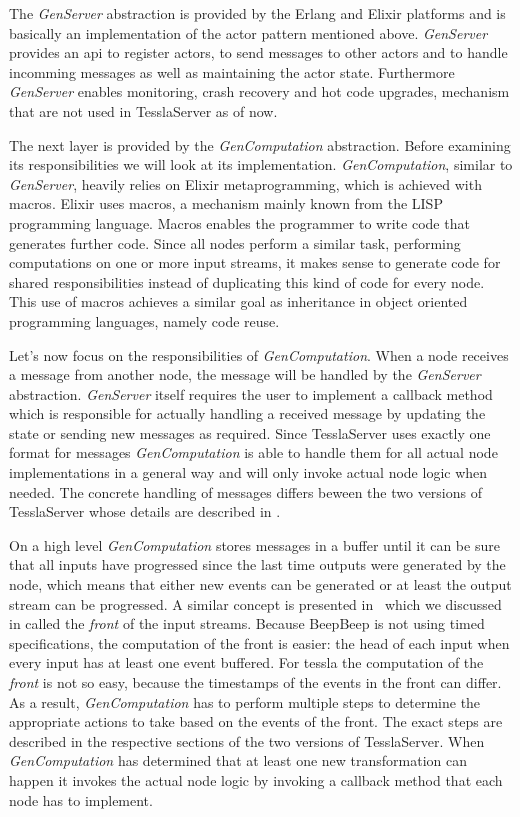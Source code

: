 The \emph{GenServer} abstraction is provided by the Erlang and Elixir platforms and is basically an implementation of the actor pattern mentioned above.
\emph{GenServer} provides an \gls{api} to register actors, to send messages to other actors and to handle incomming messages as well as maintaining the actor state.
Furthermore \emph{GenServer} enables monitoring, crash recovery and hot code upgrades, mechanism that are not used in TesslaServer as of now.

The next layer is provided by the \emph{GenComputation} abstraction.
Before examining its responsibilities we will look at its implementation.
\emph{GenComputation}, similar to \emph{GenServer}, heavily relies on Elixir metaprogramming, which is achieved with macros.
Elixir uses macros, a mechanism mainly known from the LISP programming language.
Macros enables the programmer to write code that generates further code.
Since all nodes perform a similar task, performing computations on one or more input streams, it makes sense to generate code for shared responsibilities instead of duplicating this kind of code for every node.
This use of macros achieves a similar goal as inheritance in object oriented programming languages, namely code reuse.

Let's now focus on the responsibilities of \emph{GenComputation}.
When a node receives a message from another node, the message will be handled by the \emph{GenServer} abstraction.
\emph{GenServer} itself requires the user to implement a callback method which is responsible for actually handling a received message by updating the state or sending new messages as required.
Since TesslaServer uses exactly one format for messages \emph{GenComputation} is able to handle them for all actual node implementations in a general way and will only invoke actual node logic when needed.
The concrete handling of messages differs beween the two versions of TesslaServer whose details are described in .

On a high level \emph{GenComputation} stores messages in a buffer until it can be sure that all inputs have progressed since the last time outputs were generated by the node, which means that either new events can be generated or at least the output stream can be progressed.
A similar concept is presented in~\cite{Hall2011} which we discussed in  called the \emph{front} of the input streams.
Because BeepBeep is not using timed specifications, the computation of the front is easier: the head of each input when every input has at least one event buffered.
For \gls{tessla} the computation of the \emph{front} is not so easy, because the timestamps of the events in the front can differ.
As a result, \emph{GenComputation} has to perform multiple steps to determine the appropriate actions to take based on the events of the front.
The exact steps are described in the respective sections of the two versions of TesslaServer.
When \emph{GenComputation} has determined that at least one new transformation can happen it invokes the actual node logic by invoking a callback method that each node has to implement.


